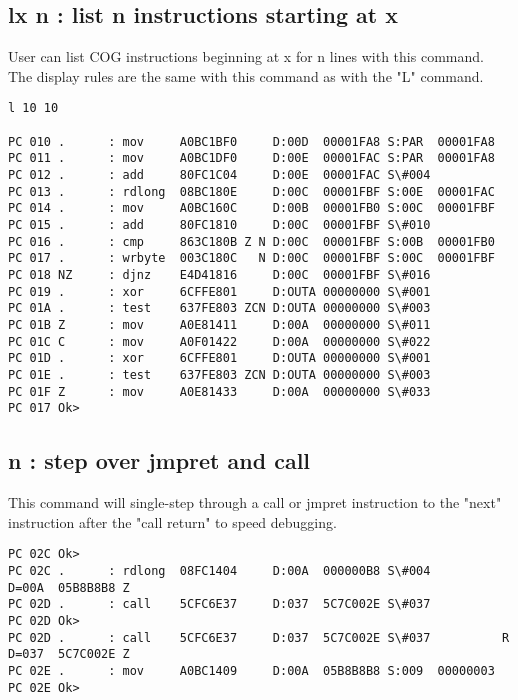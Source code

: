 \documentclass{article}
\numberwithin{equation}{section} %
\begin{document}
\subsection{lx n   : list n instructions starting at x}

User can list COG instructions beginning at x for n lines with this command. The
display rules are the same with this command as with the "L" command.

\begin{lstlisting}
l 10 10

PC 010 .      : mov     A0BC1BF0     D:00D  00001FA8 S:PAR  00001FA8
PC 011 .      : mov     A0BC1DF0     D:00E  00001FAC S:PAR  00001FA8
PC 012 .      : add     80FC1C04     D:00E  00001FAC S\#004
PC 013 .      : rdlong  08BC180E     D:00C  00001FBF S:00E  00001FAC
PC 014 .      : mov     A0BC160C     D:00B  00001FB0 S:00C  00001FBF
PC 015 .      : add     80FC1810     D:00C  00001FBF S\#010
PC 016 .      : cmp     863C180B Z N D:00C  00001FBF S:00B  00001FB0
PC 017 .      : wrbyte  003C180C   N D:00C  00001FBF S:00C  00001FBF
PC 018 NZ     : djnz    E4D41816     D:00C  00001FBF S\#016
PC 019 .      : xor     6CFFE801     D:OUTA 00000000 S\#001
PC 01A .      : test    637FE803 ZCN D:OUTA 00000000 S\#003
PC 01B Z      : mov     A0E81411     D:00A  00000000 S\#011
PC 01C C      : mov     A0F01422     D:00A  00000000 S\#022
PC 01D .      : xor     6CFFE801     D:OUTA 00000000 S\#001
PC 01E .      : test    637FE803 ZCN D:OUTA 00000000 S\#003
PC 01F Z      : mov     A0E81433     D:00A  00000000 S\#033
PC 017 Ok>
\end{lstlisting}

\subsection{n      : step over jmpret and call}

This command will single-step through a call or jmpret instruction to the "next"
instruction after the "call return" to speed debugging.

\begin{lstlisting}
PC 02C Ok>
PC 02C .      : rdlong  08FC1404     D:00A  000000B8 S\#004           D=00A  05B8B8B8 Z
PC 02D .      : call    5CFC6E37     D:037  5C7C002E S\#037
PC 02D Ok>
PC 02D .      : call    5CFC6E37     D:037  5C7C002E S\#037          R D=037  5C7C002E Z
PC 02E .      : mov     A0BC1409     D:00A  05B8B8B8 S:009  00000003
PC 02E Ok>
\end{lstlisting}
\end{document}
